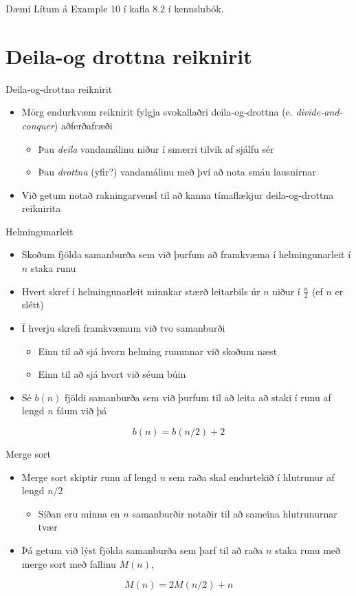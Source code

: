 \documentclass[handout]{beamer}
\begin{document}
\begin{frame}{Dæmi}
Lítum á Example 10 í kafla 8.2 í kennslubók.
\end{frame}



\section{Deila-og drottna reiknirit}

\begin{frame}{Deila-og-drottna reiknirit}
\begin{itemize}
 \item Mörg endurkvæm reiknirit fylgja svokallaðri deila-og-drottna (e. \emph{divide-and-conquer}) aðferðafræði
 \begin{itemize}
  \item Þau \emph{deila} vandamálinu niður í smærri tilvik af sjálfu sér
  \item Þau \emph{drottna} (yfir?) vandamálinu með því að nota smáu lausnirnar
 \end{itemize}
 \item Við getum notað rakningarvensl til að kanna tímaflækjur deila-og-drottna reiknirita
\end{itemize}
\end{frame}

\begin{frame}{Helmingunarleit}
\begin{itemize}
 \item Skoðum fjölda samanburða sem við þurfum að framkvæma í helmingunarleit í $n$ staka runu
 \item Hvert skref í helmingunarleit minnkar stærð leitarbils úr $n$ niður í $\frac{n}{2}$ (ef $n$ er slétt)
 \item Í hverju skrefi framkvæmum við tvo samanburði
 \begin{itemize}
  \item Einn til að sjá hvorn helming rununnar við skoðum næst
  \item Einn til að sjá hvort við séum búin
 \end{itemize}
 \item Sé $b(n)$ fjöldi samanburða sem við þurfum til að leita að staki í runu af lengd $n$ fáum við þá
\end{itemize}
\[
 b(n) = b(n/2) + 2
\]
\end{frame}

\begin{frame}{Merge sort}
\begin{itemize}
 \item Merge sort skiptir runu af lengd $n$ sem raða skal endurtekið í hlutrunur af lengd $n/2$
 \begin{itemize}
  \item Síðan eru minna en $n$ samanburðir notaðir til að sameina hlutrunurnar tvær
 \end{itemize}
 \item Þá getum við lýst fjölda samanburða sem þarf til að raða $n$ staka runu með merge sort með fallinu $M(n)$,
\end{itemize}
\[
 M(n) = 2M(n/2) + n
\]
\end{frame}
\end{document}

